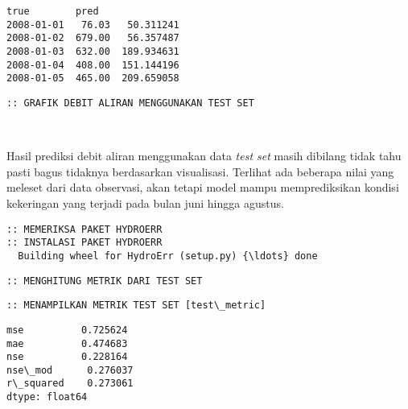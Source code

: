 \documentclass[11pt]{article}
\makeatletter
\newcommand{\boxspacing}{\kern\kvtcb@left@rule\kern\kvtcb@boxsep}
\newcommand{\prompt}[4]{
        \ttfamily\llap{{\color{#2}[#3]:\hspace{3pt}#4}}\vspace{-\baselineskip}
    }
\makeatother
\begin{document}
            \begin{tcolorbox}[breakable, size=fbox, boxrule=.5pt, pad at break*=1mm, opacityfill=0]
\prompt{Out}{outcolor}{0}{\boxspacing}
\begin{Verbatim}[commandchars=\\\{\}]
              true        pred
2008-01-01   76.03   50.311241
2008-01-02  679.00   56.357487
2008-01-03  632.00  189.934631
2008-01-04  408.00  151.144196
2008-01-05  465.00  209.659058
\end{Verbatim}
\end{tcolorbox}
        
    \begin{Verbatim}[commandchars=\\\{\}]
:: GRAFIK DEBIT ALIRAN MENGGUNAKAN TEST SET
    \end{Verbatim}

    \begin{center}
    \end{center}
    { \hspace*{\fill} \\}
    
    Hasil prediksi debit aliran menggunakan data \emph{test set} masih
dibilang tidak tahu pasti bagus tidaknya berdasarkan visualisasi.
Terlihat ada beberapa nilai yang meleset dari data observasi, akan
tetapi model mampu memprediksikan kondisi kekeringan yang terjadi pada
bulan juni hingga agustus.

    \begin{Verbatim}[commandchars=\\\{\}]
:: MEMERIKSA PAKET HYDROERR
:: INSTALASI PAKET HYDROERR
  Building wheel for HydroErr (setup.py) {\ldots} done
    \end{Verbatim}

    \begin{Verbatim}[commandchars=\\\{\}]
:: MENGHITUNG METRIK DARI TEST SET
    \end{Verbatim}

    \begin{Verbatim}[commandchars=\\\{\}]
:: MENAMPILKAN METRIK TEST SET [test\_metric]
    \end{Verbatim}

            \begin{tcolorbox}[breakable, size=fbox, boxrule=.5pt, pad at break*=1mm, opacityfill=0]
\prompt{Out}{outcolor}{0}{\boxspacing}
\begin{Verbatim}[commandchars=\\\{\}]
mse          0.725624
mae          0.474683
nse          0.228164
nse\_mod      0.276037
r\_squared    0.273061
dtype: float64
\end{Verbatim}
\end{tcolorbox}
        
\end{document}
